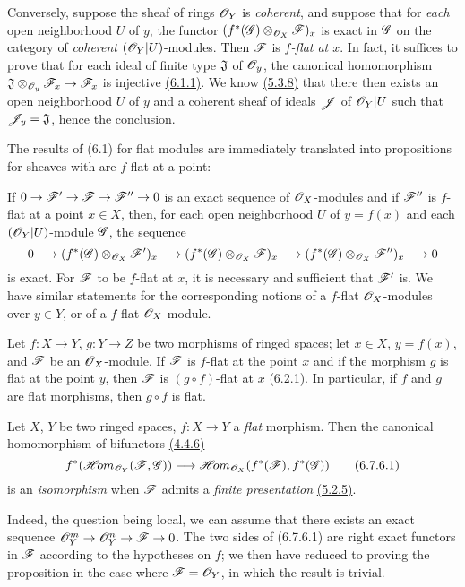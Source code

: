 \begin{env}[6.7.3]
\label{0.6.7.3}
Conversely, suppose the sheaf of rings $\mathscr{O}_Y$ is {\em coherent}, and suppose that for
{\em each} open neighborhood $U$ of $y$, the functor $(f^*(\mathscr{G})\otimes_{\mathscr{O}_X}\mathscr{F})_x$
is exact in $\mathscr{G}$ on the category of {\em coherent} $(\mathscr{O}_Y|U)$-modules. Then $\mathscr{F}$ is
{\em $f$-flat at $x$}. In fact, it suffices to prove that for each ideal of finite type
$\mathfrak{J}$ of $\mathscr{O}_y$, the canonical homomorphism
$\mathfrak{J}\otimes_{\mathscr{O}_y}\mathscr{F}_x\to\mathscr{F}_x$ is injective \hyperref[0.6.1.1]{(6.1.1)}. We know
\hyperref[0.5.3.8]{(5.3.8)} that there then exists an open neighborhood
$U$ of $y$ and a coherent sheaf of ideals $\mathscr{J}$ of $\mathscr{O}_Y|U$ such that
$\mathscr{J}_y=\mathfrak{J}$, hence the conclusion.
\end{env}

\begin{env}[6.7.4]
\label{0.6.7.4}
The results of (6.1) for flat modules are immediately translated into propositions for
sheaves with are $f$-flat at a point:

If $0\to\mathscr{F}'\to\mathscr{F}\to\mathscr{F}''\to 0$ is an exact sequence of $\mathscr{O}_X$-modules and if
$\mathscr{F}''$ is $f$-flat at a point $x\in X$, then, for each open neighborhood $U$ of $y=f(x)$
and each $(\mathscr{O}_Y|U)$-module $\mathscr{G}$, the sequence
\[
  0\longrightarrow(f^*(\mathscr{G})\otimes_{\mathscr{O}_X}\mathscr{F}')_x
  \longrightarrow(f^*(\mathscr{G})\otimes_{\mathscr{O}_X}\mathscr{F})_x
  \longrightarrow(f^*(\mathscr{G})\otimes_{\mathscr{O}_X}\mathscr{F}'')_x\longrightarrow 0
\]
is exact. For $\mathscr{F}$ to be $f$-flat at $x$, it is necessary and sufficient that $\mathscr{F}'$
is. We have similar statements for the corresponding notions of a $f$-flat $\mathscr{O}_X$-modules
over $y\in Y$, or of a $f$-flat $\mathscr{O}_X$-module.
\end{env}

\begin{env}[6.7.5]
\label{0.6.7.5}
Let $f:X\to Y$, $g:Y\to Z$ be two morphisms of ringed spaces; let $x\in X$, $y=f(x)$, and
$\mathscr{F}$ be an $\mathscr{O}_X$-module. If $\mathscr{F}$ is $f$-flat at the point $x$ and if the morphism
$g$ is flat at the point $y$, then $\mathscr{F}$ is $(g\circ f)$-flat at $x$ \hyperref[0.6.2.1]{(6.2.1)}. In
particular, if $f$ and $g$ are flat morphisms, then $g\circ f$ is flat.
\end{env}

\begin{env}[6.7.6]
\label{0.6.7.6}
Let $X$, $Y$ be two ringed spaces, $f:X\to Y$ a {\em flat} morphism. Then the canonical
homomorphism of bifunctors \hyperref[0.4.4.6]{(4.4.6)}
\[
  f^*(\mathscr{H}\!{om}_{\mathscr{O}_Y}(\mathscr{F},\mathscr{G}))\longrightarrow\mathscr{H}\!{om}_{\mathscr{O}_X}(f^*(\mathscr{F}),f^*(\mathscr{G}))
  \tag{6.7.6.1}
\]
is an {\em isomorphism} when $\mathscr{F}$ admits a {\em finite presentation} \hyperref[0.5.2.5]{(5.2.5)}.

Indeed, the question being local, we can assume that there exists an exact sequence
$\mathscr{O}_Y^m\to\mathscr{O}_Y^n\to\mathscr{F}\to 0$. The two sides of (6.7.6.1) are right exact functors in
$\mathscr{F}$ according to the hypotheses on $f$; we then have reduced to proving the proposition
in the case where $\mathscr{F}=\mathscr{O}_Y$, in which the result is trivial.
\end{env}

